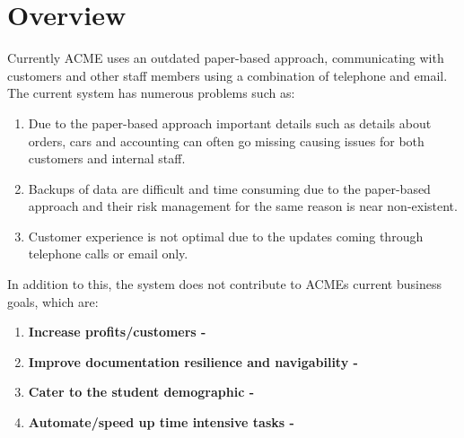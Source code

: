 \section{Overview}

Currently ACME uses an outdated paper-based approach, communicating with customers and other staff members using a combination of telephone and email.
The current system has numerous problems such as: 
\begin{enumerate}
  \item Due to the paper-based approach important details such as details about orders, cars and accounting can often go missing causing issues 
  for both customers and internal staff.
  \item Backups of data are difficult and time consuming due to the paper-based approach and their risk management for the same reason is near non-existent.
  \item Customer experience is not optimal due to the updates coming through telephone calls or email only.
\end{enumerate}

In addition to this, the system does not contribute to ACMEs current business goals, which are:
\begin{enumerate}
  \item \textbf{Increase profits/customers -}
  \item \textbf{Improve documentation resilience and navigability -}
  \item \textbf{Cater to the student demographic -}
  \item \textbf{Automate/speed up time intensive tasks -}
\end{enumerate}


